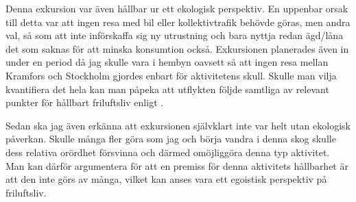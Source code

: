 \documentclass[12pt]{article}   %
\begin{document}
Denna exkursion var även hållbar ur ett ekologisk perspektiv. En uppenbar orsak till detta var
att ingen resa med bil eller kollektivtrafik behövde göras, men andra val, så som att inte
införskaffa sig ny utrustning och bara nyttja redan ägd/låna det som saknas för att minska
konsumtion också. Exkursionen planerades även in under en period då jag skulle vara i hembyn
oavsett så att ingen resa mellan Kramfors och Stockholm gjordes enbart för aktivitetens skull.
Skulle man vilja kvantifiera det hela kan man påpeka att utflykten följde samtliga av
relevant punkter för hållbart friluftsliv enligt \cite{checklista}.

Sedan ska jag även erkänna att exkursionen självklart inte var helt utan ekologisk påverkan.
Skulle många fler göra som jag och börja vandra i denna skog skulle dess relativa orördhet
försvinna och därmed omöjliggöra denna typ aktivitet. Man kan därför argumentera för att en premiss
för denna aktivitets hållbarhet är att den inte görs av många, vilket kan anses vara ett egoistisk
perspektiv på friluftsliv.

\pagebreak

\renewcommand{\refname}{Källor}


\end{document}
